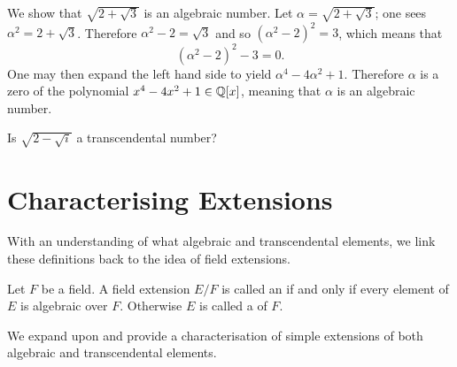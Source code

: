 \begin{example}
    We show that $\sqrt{2+\sqrt3}$ is an algebraic number. Let $\alpha = \sqrt{2+\sqrt3}$; one sees $\alpha^2 = 2 + \sqrt3$. Therefore $\alpha^2 - 2 = \sqrt3$ and so $(\alpha^2 - 2)^2 = 3$, which means that
    \[
        (\alpha^2 - 2)^2 - 3 = 0.
    \]
    One may then expand the left hand side to yield $\alpha^4 - 4\alpha^2 + 1$. Therefore $\alpha$ is a zero of the polynomial $x^4 - 4x^2 + 1 \in \mathbb{Q}[x]$, meaning that $\alpha$ is an algebraic number.
\end{example}

\begin{exercise}
    Is $\sqrt{2 - \sqrt{i}}$ a transcendental number?
\end{exercise}



\section{Characterising Extensions}
With an understanding of what algebraic and transcendental elements, we link these definitions back to the idea of field extensions.

\begin{definition}
    Let $F$ be a field. A field extension $E/F$ is called an  if and only if every element of $E$ is algebraic over $F$. Otherwise $E$ is called a  of $F$.
\end{definition}

We expand upon  and provide a characterisation of simple extensions of both algebraic and transcendental elements.

